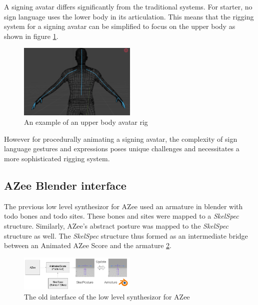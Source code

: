 \documentclass[../../main.tex]{subfiles}
\begin{document}
A signing avatar differs significantly from the traditional systems. For starter, no sign language uses the lower body in its articulation. This means that the rigging system for a signing avatar can be simplified to focus on the upper body as shown in figure \ref{ref:upper_body_avatar}. 

\begin{figure}[h]
    \centering
    \includegraphics[width=0.5\textwidth]{chapters/rigging_layers/images/upper_body_avatar.png}
    \caption{An example of an upper body avatar rig}
    \label{ref:upper_body_avatar}
\end{figure}

However for procedurally animating a signing avatar, the complexity of sign language gestures and expressions poses unique challenges and necessitates a more sophisticated rigging system.

\subsection{AZee Blender interface}

The previous low level synthesizor for AZee \cite{fabrizio} used an armature in blender with todo bones and todo sites. These bones and sites were mapped to a \emph{SkelSpec} structure. Similarly, AZee's abstract posture was mapped to the \emph{SkelSpec} structure as well. The \emph{SkelSpec} structure thus formed as an intermediate bridge between an Animated AZee Score and the armature \ref{fig:old_interface}. 

\begin{figure}[h]
    \centering
    \includegraphics[width=0.5\textwidth]{chapters/rigging_layers/images/old_interface.png}
    \caption{The old interface of the low level synthesizor for AZee}
    \label{fig:old_interface}
\end{figure}
\end{document}
